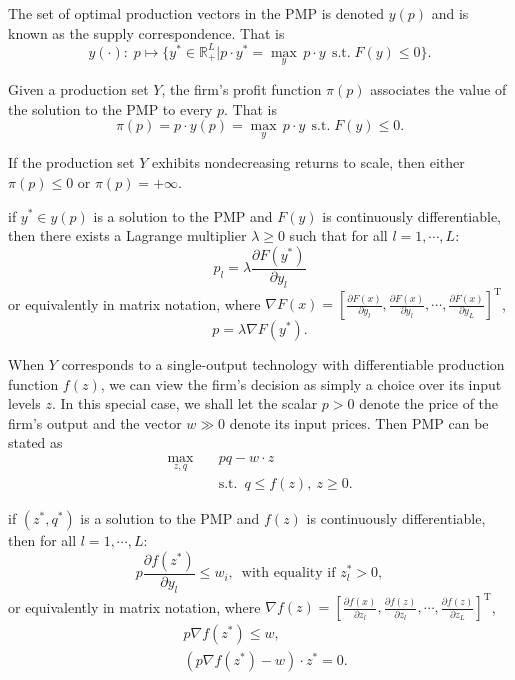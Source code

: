 \documentclass[12pt,fleqn]{book} %
\begin{document}
\begin{definition}
	The set of optimal production vectors in the PMP is denoted $y(p)$ and is known as the supply correspondence. That is
	\[
	y(\cdot):\;p\mapsto \{y^*\in\mathbb{R}_+^L|p\cdot y^*=\max_{y}\, p\cdot y\ \ \mathrm{s.t.}\;F(y)\le0\}.
	\]	
\end{definition}

\begin{definition}
	Given a production set $Y$, the firm's profit function $\pi(p)$ associates the value of the solution to the PMP to every $p$. That is
	\[
	\pi(p)=p\cdot y(p)=\max_{y}\, p\cdot y\ \ \mathrm{s.t.}\; F(y)\le0.
	\]
\end{definition}

\begin{proposition}
	If the production set $Y$ exhibits nondecreasing returns to scale, then either $\pi(p)\le 0$ or $\pi(p)=+\infty$.
\end{proposition}

\begin{theorem}
	if $y^* \in y(p)$ is a solution to the PMP and $F(y)$ is continuously differentiable, then there exists a
	Lagrange multiplier $\lambda\ge0$ such that for all $l = 1,\cdots, L$:
	\[
	p_l=\lambda\frac{\partial F(y^*)}{\partial y_l}
	\]
	or equivalently in matrix notation, where $\nabla F(x)= \left[\frac{\partial F(x)}{\partial y_l},\frac{\partial F(x)}{\partial y_l},\cdots,\frac{\partial F(x)}{\partial y_L} \right]^\mathrm{T}$,
    \[
    p=\lambda\nabla F(y^*).
    \]
\end{theorem}


When $Y$ corresponds to a single-output technology with differentiable production function $f(z)$, we can view the firm's decision as simply a choice over its input levels $z$. In this special case, we shall let the scalar $p > 0$ denote the price of the firm's output and the vector $w \gg0$ denote its input prices. Then PMP can be stated as
\begin{align*}
\max_{z,q} \quad &  pq-w\cdot z\\
& \mathrm{s.t.}\ \; q\le f(z), \ z\ge 0.
\end{align*}


\begin{theorem}
	if $(z^*,q^*)$ is a solution to the PMP and $f(z)$ is continuously differentiable, then for all $l = 1,\cdots, L$:
	\[
	p\frac{\partial f(z^*)}{\partial y_l}\le w_i,\ \;\text{with equality if } z^*_l > 0,
	\]
	or equivalently in matrix notation, where $\nabla f(z)= \left[\frac{\partial f(x)}{\partial z_l},\frac{\partial f(z)}{\partial z_l},\cdots,\frac{\partial f(z)}{\partial z_L} \right]^\mathrm{T}$,
	\begin{align*}
	& p\nabla f(z^*)\le w, \\
	&(p\nabla f(z^*)- w)\cdot z^*= 0.
	\end{align*}
	
\end{theorem}
\end{document}
